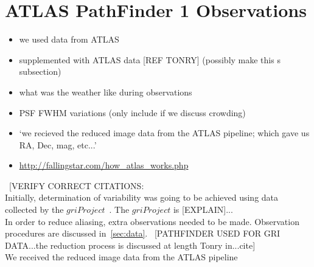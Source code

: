 \documentclass[aps,prb,twocolumn,superscriptaddress]{revtex4-1}
\begin{document}
\section{ATLAS PathFinder 1 Observations}
\begin{itemize}
	\item{} we used data from ATLAS
	\item{} supplemented with ATLAS data [REF TONRY] (possibly make this s subsection)
	\item{} what was the weather like during observations
	\item{} PSF FWHM variations (only include if we discuss crowding)
	\item{} `we recieved the reduced image data from the ATLAS pipeline; which gave us RA, Dec, mag, etc...'
	\item{}\url{http://fallingstar.com/how_atlas_works.php}
\end{itemize}


~[VERIFY CORRECT CITATIONS:\\%
Initially, determination of variability was going to be achieved using data collected by the $gri Project$~\cite{gri}.  The $gri Project$ is [EXPLAIN]...\\
In order to reduce aliasing, extra observations needed to be made.  Observation procedures are discussed in~\cref{sec:data}.
~[PATHFINDER USED FOR GRI DATA...the reduction process is discussed at length Tonry in...cite]\\
We received the reduced image data from the ATLAS pipeline~\cite{gri}~\cite{tonrypipe}
\end{document}
